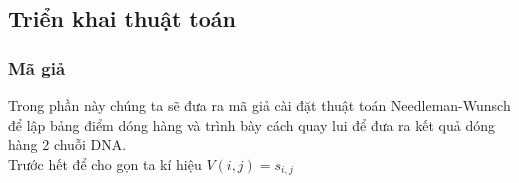 \subsection{Triển khai thuật toán}
\subsubsection{Mã giả}
Trong phần này chúng ta sẽ đưa ra mã giả cài đặt thuật toán Needleman-Wunsch để lập bảng điểm
dóng hàng và trình bày cách quay lui để đưa ra kết quả dóng hàng 2 chuỗi DNA. \\
Trước hết để cho gọn ta kí hiệu $V(i, j) = s_{i,j}$